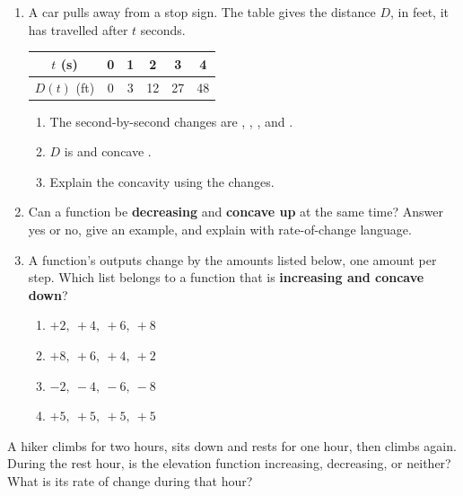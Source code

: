 \documentclass[10pt]{article}
\begin{document}
\begin{enumerate}[itemsep=10pt]
\item A car pulls away from a stop sign. The table gives the distance $D$, in
      feet, it has travelled after $t$ seconds.

\smallskip
\renewcommand{\arraystretch}{1.4}
\begin{tabular}{|c|c|c|c|c|c|}
\hline
$t$ (s) & 0 & 1 & 2 & 3 & 4 \\
\hline
$D(t)$ (ft) & 0 & 3 & 12 & 27 & 48 \\
\hline
\end{tabular}
\smallskip

\begin{enumerate}[label=(\alph*), itemsep=4pt]
  \item The second-by-second changes are \blank{1.2cm}, \blank{1.2cm},
        \blank{1.2cm}, and \blank{1.2cm}.
  \item $D$ is \blank{2.8cm} and concave \blank{1.6cm}.
  \item Explain the concavity using the changes.

        \vspace{0.05in}
        \writeline
\end{enumerate}

\item Can a function be \textbf{decreasing} and \textbf{concave up} at the same
      time? Answer yes or no, give an example, and explain with rate-of-change
      language.

\vspace{0.05in}

\item A function's outputs change by the amounts listed below, one amount per
      step. Which list belongs to a function that is \textbf{increasing and
      concave down}?

\begin{enumerate}[label=\Alph*., itemsep=3pt]
  \item $+2,\ +4,\ +6,\ +8$
  \item $+8,\ +6,\ +4,\ +2$
  \item $-2,\ -4,\ -6,\ -8$
  \item $+5,\ +5,\ +5,\ +5$
\end{enumerate}

\end{enumerate}

\vspace{0.1in}

\boxguard
\begin{extensionbox}
A hiker climbs for two hours, sits down and rests for one hour, then climbs
again. During the rest hour, is the elevation function increasing, decreasing,
or neither? What is its rate of change during that hour?

\vspace{0.05in}
\end{extensionbox}
\end{document}
